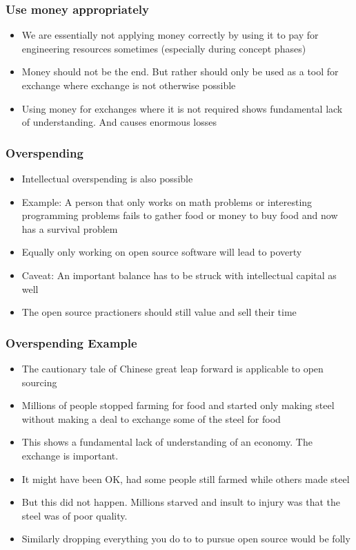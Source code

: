 \documentclass{beamer}
\begin{document}
\begin{frame}
\frametitle{Use money appropriately}

\begin{itemize}
\item We are essentially not applying money correctly by using it to pay for engineering resources sometimes (especially during concept phases)
\item Money should not be the end. But rather should only be used as a tool for exchange where exchange is not otherwise possible
\item Using money for exchanges where it is not required shows fundamental lack of understanding. And causes enormous losses
\end{itemize}

\end{frame}


\begin{frame}
\frametitle{Overspending}

\begin{itemize}
\item Intellectual overspending is also possible 
\item Example:  A person that only works on math problems or interesting programming problems fails to gather food or money to buy food and now has a survival problem
\item Equally only working on open source software will lead to poverty
\item Caveat:  An important balance has to be struck with intellectual capital as well
\item The open source practioners should still value and sell their time
\end{itemize}

\end{frame}


\begin{frame}
\frametitle{Overspending Example}

\begin{itemize}
\item The cautionary tale of Chinese great leap forward is applicable to open sourcing 
\item Millions of people stopped farming for food and started only making steel without making a deal to exchange some of the steel for food
\item  This shows a fundamental lack of understanding of an economy.  The exchange is important. 
\item It might have been OK, had some people still farmed while others made steel
\item But this did not happen.  Millions starved and insult to injury was that the steel was of poor quality.
\item Similarly dropping everything you do to to pursue open source would be folly
\end{itemize}

\end{frame}
\end{document}
